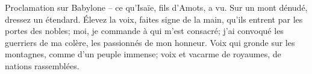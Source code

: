 Proclamation sur Babylone – ce qu’Isaïe, fils d’Amots, a vu.
Sur un mont dénudé, dressez un étendard.
Élevez la voix, faites signe de la main,
	qu’ils entrent par les portes des nobles;
	moi, je commande à qui m’est consacré;
	j’ai convoqué les guerriers de ma colère, les passionnés de mon honneur.
Voix qui gronde sur les montagnes, comme d’un peuple immense;
	voix et vacarme de royaumes, de nations rassemblées.
